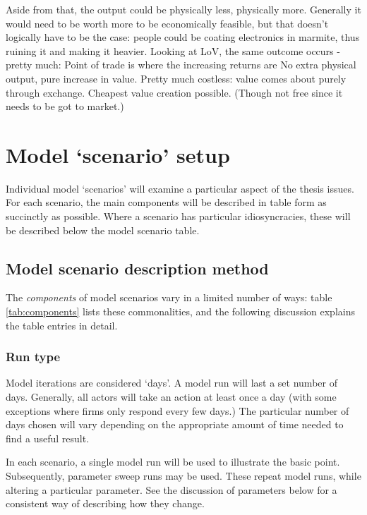 Aside from that, the output could be physically less, physically more. Generally it would need to be worth more to be economically feasible, but that doesn't logically have to be the case: people could be coating electronics in marmite, thus ruining it and making it heavier.
Looking at LoV, the same outcome occurs - pretty much:
Point of trade is where the increasing returns are
No extra physical output, pure increase in value. Pretty much costless: value comes about purely through exchange. Cheapest value creation possible. (Though not free since it needs to be got to market.)



\section{Model `scenario' setup \label{sec:scenarioFramework}}

Individual model `scenarios' will examine a particular aspect of the thesis issues. For each scenario, the main components will be described in table form as succinctly as possible. Where a scenario has particular idiosyncracies, these will be described below the model scenario table. 

\subsection{Model scenario description method}

The \emph{components} of model scenarios vary in a limited number of ways: table \ref{tab:components} lists these commonalities, and the following discussion explains the table entries in detail. 



\subsubsection{Run type}

Model iterations are considered `days'. A model run will last a set number of days. Generally, all actors will take an action at least once a day (with some exceptions where firms only respond every few days.) The particular number of days chosen will vary depending on the appropriate amount of time needed to find a useful result. 

In each scenario, a single model run will be used to illustrate the basic point. Subsequently, parameter sweep runs may be used. These repeat model runs, while altering a particular parameter. See the discussion of parameters below for a consistent way of describing how they change.

